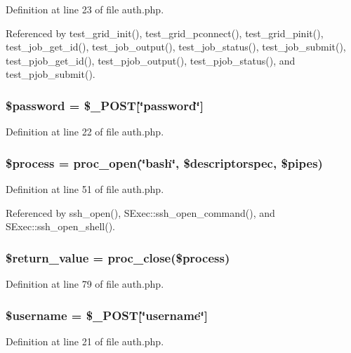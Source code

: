 Definition at line 23 of file auth.php.

Referenced by test\_\-grid\_\-init(), test\_\-grid\_\-pconnect(), test\_\-grid\_\-pinit(), test\_\-job\_\-get\_\-id(), test\_\-job\_\-output(), test\_\-job\_\-status(), test\_\-job\_\-submit(), test\_\-pjob\_\-get\_\-id(), test\_\-pjob\_\-output(), test\_\-pjob\_\-status(), and test\_\-pjob\_\-submit().
\subsubsection{\setlength{\rightskip}{0pt plus 5cm}\$password = \$\_\-POST[\char`\"{}password\char`\"{}]}\label{auth_8php_a1}




Definition at line 22 of file auth.php.
\subsubsection{\setlength{\rightskip}{0pt plus 5cm}\$process = proc\_\-open(\char`\"{}bash\char`\"{}, \$descriptorspec, \$pipes)}\label{auth_8php_a3}




Definition at line 51 of file auth.php.

Referenced by ssh\_\-open(), SExec::ssh\_\-open\_\-command(), and SExec::ssh\_\-open\_\-shell().
\subsubsection{\setlength{\rightskip}{0pt plus 5cm}\$return\_\-value = proc\_\-close(\$process)}\label{auth_8php_a4}




Definition at line 79 of file auth.php.
\subsubsection{\setlength{\rightskip}{0pt plus 5cm}\$username = \$\_\-POST[\char`\"{}username\char`\"{}]}\label{auth_8php_a0}




Definition at line 21 of file auth.php.